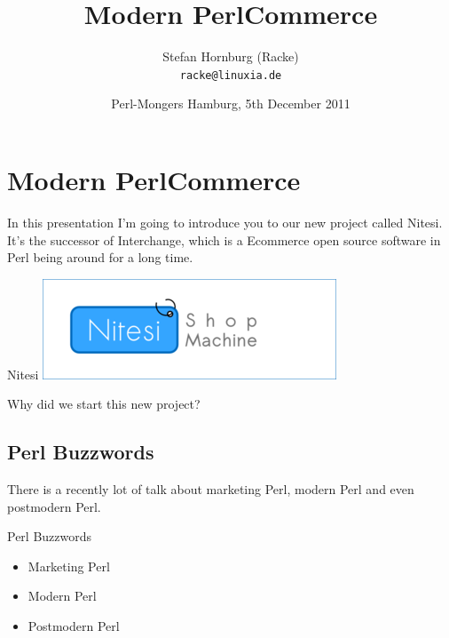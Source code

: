 
\usepackage[T1]{fontenc}
\usepackage{mathptmx}
\usepackage[scaled=.90]{helvet}
\usepackage{courier}

\usepackage{beamerthemesplit}
\usepackage{verbatim}
\usepackage{hyperref}
\usepackage{listings}
\lstset{language=Perl,basicstyle=\footnotesize,tabsize=3,showstringspaces=false}

\title{Modern PerlCommerce}
\author[racke]{Stefan Hornburg (Racke)\\ \texttt{racke@linuxia.de}}
\date[]{Perl-Mongers Hamburg, 5th December 2011}


\maketitle{}

\begin{frame}
  \titlepage
\end{frame}

\tableofcontents

\section{Modern PerlCommerce}
In this presentation I'm going to introduce you to our new project
called Nitesi. It's the successor of Interchange, which is a Ecommerce
open source software in Perl being around for a long time.

\begin{frame}{Nitesi}
  \includegraphics{nitesi.png}
\end{frame}

Why did we start this new project?

\subsection{Perl Buzzwords}
There is a recently lot of talk about marketing Perl, modern Perl
and even postmodern Perl.

\begin{frame}{Perl Buzzwords}
\begin{itemize}
\item Marketing Perl
\item Modern Perl
\item Postmodern Perl
\end{itemize}
\end{frame}

